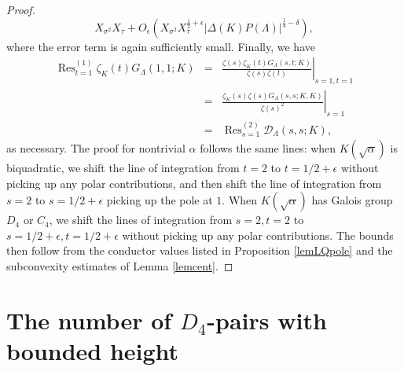 \documentclass[10pt]{article}
\theoremstyle{plain}
\theoremstyle{definition}
\theoremstyle{remark}
\DeclareMathOperator{\Res}{Res}
\def\cD{{\mathcal D}}
\begin{document}
\begin{proof}
\begin{equation*}
X_{\sigma^2}X_\tau+O_\epsilon(X_{\sigma^2}X_\tau^{\frac12+\epsilon}
|\Delta(K)P(\Lambda)|^{\frac14-\delta}),
\end{equation*}
where the error term is again sufficiently small.
Finally, we have
\begin{equation*}
\begin{array}{rcl}
\displaystyle\Res^{(1)}_{t=1}\zeta_K(t)G_\Lambda(1,1;K)&=&
\displaystyle\left.\frac{\zeta(s)\zeta_K(t)G_\Lambda(s,t;K)}{\zeta(s)\zeta(t)}\right|_{s=1,t=1}
\\[.2in]&=&
\displaystyle\left.\frac{\zeta_K(s)\zeta(s)G_\Lambda(s,s;K,K)}{\zeta(s)^2}\right|_{s=1}
\\[.2in]&=&
\displaystyle\Res^{(2)}_{s=1}\cD_\Lambda(s,s;K),
\end{array}
\end{equation*}
as necessary.  The proof for nontrivial $\alpha$ follows the same
lines: when $K(\sqrt{\alpha})$ is biquadratic, we shift the line of
integration from $t=2$ to $t=1/2+\epsilon$ without picking up any
polar contributions, and then shift the line of integration from $s=2$
to $s=1/2+\epsilon$ picking up the pole at $1$. When $K(\sqrt{\alpha})$ has
Galois group $D_4$ or $C_4$, we shift the lines of integration from
$s=2,t=2$ to $s=1/2+\epsilon,t=1/2+\epsilon$ without picking up any
polar contributions. The bounds then follow from the conductor values
listed in Proposition \ref{lemLQpole} and the subconvexity estimates of Lemma
\ref{lemcent}.
\end{proof}




%


\section{The number of $D_4$-pairs with bounded height}
\end{document}
